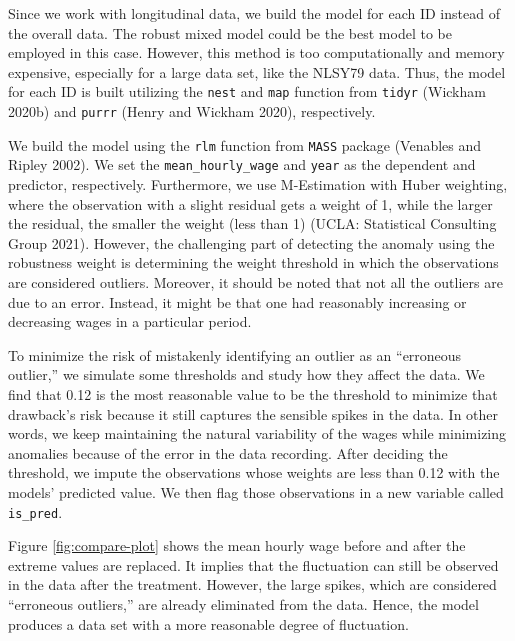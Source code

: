 \documentclass{article}
\begin{document}
Since we work with longitudinal data, we build the model for each ID instead of the overall data. The robust mixed model could be the best model to be employed in this case. However, this method is too computationally and memory expensive, especially for a large data set, like the NLSY79 data. Thus, the model for each ID is built utilizing the \texttt{nest} and \texttt{map} function from \texttt{tidyr} (Wickham 2020b) and \texttt{purrr} (Henry and Wickham 2020), respectively.

We build the model using the \texttt{rlm} function from \texttt{MASS} package (Venables and Ripley 2002). We set the \texttt{mean\_hourly\_wage} and \texttt{year} as the dependent and predictor, respectively. Furthermore, we use M-Estimation with Huber weighting, where the observation with a slight residual gets a weight of 1, while the larger the residual, the smaller the weight (less than 1) (UCLA: Statistical Consulting Group 2021). However, the challenging part of detecting the anomaly using the robustness weight is determining the weight threshold in which the observations are considered outliers. Moreover, it should be noted that not all the outliers are due to an error. Instead, it might be that one had reasonably increasing or decreasing wages in a particular period.

To minimize the risk of mistakenly identifying an outlier as an ``erroneous outlier,'' we simulate some thresholds and study how they affect the data. We find that 0.12 is the most reasonable value to be the threshold to minimize that drawback's risk because it still captures the sensible spikes in the data. In other words, we keep maintaining the natural variability of the wages while minimizing anomalies because of the error in the data recording. After deciding the threshold, we impute the observations whose weights are less than 0.12 with the models' predicted value. We then flag those observations in a new variable called \texttt{is\_pred}.

Figure \ref{fig:compare-plot} shows the mean hourly wage before and after the extreme values are replaced. It implies that the fluctuation can still be observed in the data after the treatment. However, the large spikes, which are considered ``erroneous outliers,'' are already eliminated from the data. Hence, the model produces a data set with a more reasonable degree of fluctuation.
\end{document}
